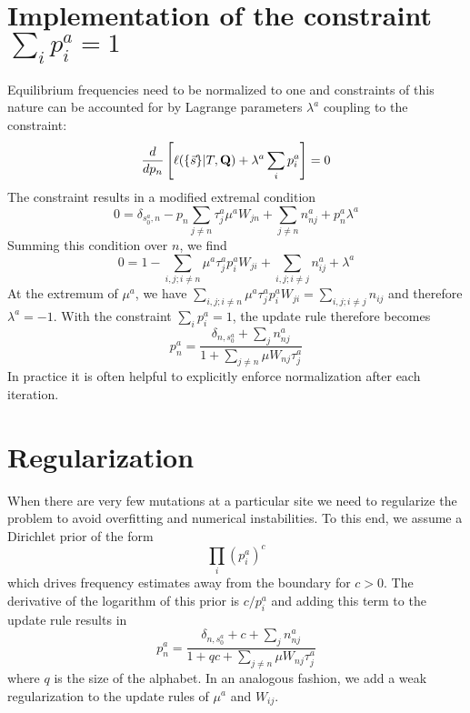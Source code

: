 \documentclass[aps,rmp,onecolumn]{revtex4}
\newcommand{\mat}[1]{{\bf #1}}
\newcommand{\eqp}{p}
\newcommand{\lh}{\ell}
\begin{document}
\section*{Implementation of the constraint $\sum_i \eqp_i^a=1$}
Equilibrium frequencies need to be normalized to one and constraints of this nature can be accounted for by Lagrange parameters $\lambda^a$ coupling to the constraint:
\begin{equation}
	\frac{d}{d \eqp_n} \left[\lh (\{\vec{s}\} |T, \mat{Q}) + \lambda^a \sum_i \eqp^a_i \right] = 0
\end{equation}
The constraint results in a modified extremal condition
\begin{equation}
	0 = \delta_{s^a_0,n}-\eqp_{n}\sum_{j\neq n} \tau^a_j \mu^a W_{j n} + \sum_{j\neq n} n^a_{nj} + \eqp^a_{n}\lambda^a
\end{equation}
Summing this condition over $n$, we find
\begin{equation}
	0 = 1 - \sum_{i,j; i \neq n}  \mu^a \tau^a_j \eqp^a_{i}W_{j i} + \sum_{i,j; i\neq j} n^a_{ij} + \lambda^a
\end{equation}
At the extremum of $\mu^a$, we have $\sum_{i,j; i \neq n} \mu^a \tau^a_j \eqp^a_{i}W_{j i} = \sum_{i,j; i\neq j} n_{ij}$ and therefore $\lambda^a=-1$.
With the constraint $\sum_i \eqp_i^a=1$, the update rule therefore becomes
\begin{equation}
	\eqp^a_n = \frac{\delta_{n,s^a_0}+\sum_j n^a_{nj}}{1 + \sum_{j\neq n} \mu W_{nj}\tau^a_j}
\end{equation}
In practice it is often helpful to explicitly enforce normalization after each iteration.

\section*{Regularization}
When there are very few mutations at a particular site we need to regularize the problem to avoid overfitting and numerical instabilities.
To this end, we assume a Dirichlet prior of the form
\begin{equation}
\prod_i \left(\eqp^a_i\right)^c
\end{equation}
which drives frequency estimates away from the boundary for $c>0$.
The derivative of the logarithm of this prior is $c/\eqp^a_i$ and adding this term to the update rule results in
\begin{equation}
	\eqp^a_n = \frac{\delta_{n,s^a_0} + c +\sum_j n^a_{nj}}{1 + qc + \sum_{j\neq n} \mu W_{nj}\tau^a_j}
\end{equation}
where $q$ is the size of the alphabet.
In an analogous fashion, we add a weak regularization to the update rules of $\mu^a$ and $W_{ij}$.
\end{document}
